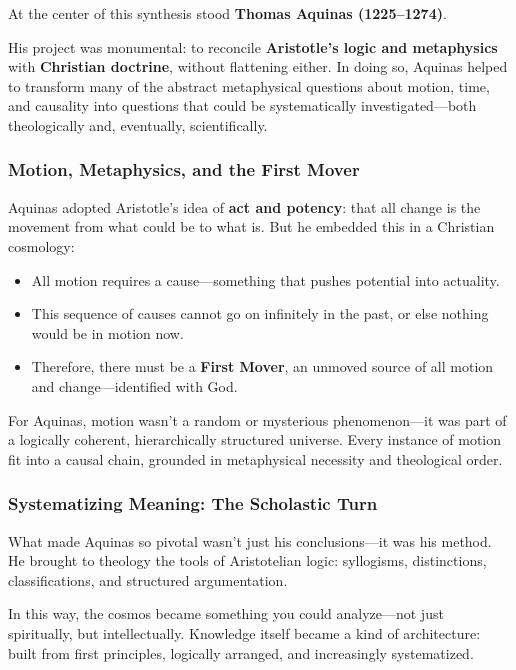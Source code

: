 At the center of this synthesis stood \textbf{Thomas Aquinas (1225–1274)}.

His project was monumental: to reconcile \textbf{Aristotle’s logic and metaphysics} with \textbf{Christian doctrine}, without flattening either. In doing so, Aquinas helped to transform many of the abstract metaphysical questions about motion, time, and causality into questions that could be systematically investigated—both theologically and, eventually, scientifically.

\subsubsection*{Motion, Metaphysics, and the First Mover}

Aquinas adopted Aristotle’s idea of \textbf{act and potency}: that all change is the movement from what could be to what is. But he embedded this in a Christian cosmology:

\begin{itemize}
    \item All motion requires a cause—something that pushes potential into actuality.
    \item This sequence of causes cannot go on infinitely in the past, or else nothing would be in motion now.
    \item Therefore, there must be a \textbf{First Mover}, an unmoved source of all motion and change—identified with God.
\end{itemize}

For Aquinas, motion wasn’t a random or mysterious phenomenon—it was part of a logically coherent, hierarchically structured universe. Every instance of motion fit into a causal chain, grounded in metaphysical necessity and theological order.

\subsubsection*{Systematizing Meaning: The Scholastic Turn}

What made Aquinas so pivotal wasn’t just his conclusions—it was his method. He brought to theology the tools of Aristotelian logic: syllogisms, distinctions, classifications, and structured argumentation.  

In this way, the cosmos became something you could analyze—not just spiritually, but intellectually. Knowledge itself became a kind of architecture: built from first principles, logically arranged, and increasingly systematized.


